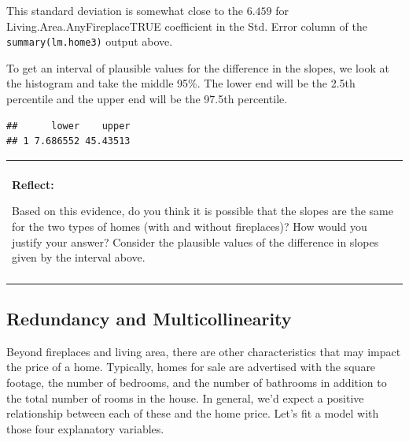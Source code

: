 \documentclass[
]{book}
\newenvironment{Shaded}{\begin{snugshade}}{\end{snugshade}}
\newcommand{\DataTypeTok}[1]{\textcolor[rgb]{0.13,0.29,0.53}{#1}}
\newcommand{\FloatTok}[1]{\textcolor[rgb]{0.00,0.00,0.81}{#1}}
\newcommand{\KeywordTok}[1]{\textcolor[rgb]{0.13,0.29,0.53}{\textbf{#1}}}
\newcommand{\NormalTok}[1]{#1}
\newcommand{\OperatorTok}[1]{\textcolor[rgb]{0.81,0.36,0.00}{\textbf{#1}}}
\newcommand{\StringTok}[1]{\textcolor[rgb]{0.31,0.60,0.02}{#1}}
\newenvironment{reflect}
{
    \begin{center}
    
    \begin{tabular}{|p{0.8\textwidth}|}
    \rowcolor{LightBlue}
    \hline\\
    \rowcolor{LightBlue}
    \textbf{Reflect:}
}
{
    \\\rowcolor{LightBlue}
    \\\hline
    \end{tabular} 
    \end{center}
}
\begin{document}
This standard deviation is somewhat close to the \(6.459\) for Living.Area.AnyFireplaceTRUE coefficient in the Std. Error column of the \texttt{summary(lm.home3)} output above.

To get an interval of plausible values for the difference in the slopes, we look at the histogram and take the middle 95\%. The lower end will be the 2.5th percentile and the upper end will be the 97.5th percentile.

\begin{Shaded}
\end{Shaded}

\begin{verbatim}
##      lower    upper
## 1 7.686552 45.43513
\end{verbatim}

\begin{reflect}
Based on this evidence, do you think it is possible that the slopes are
the same for the two types of homes (with and without fireplaces)? How
would you justify your answer? Consider the plausible values of the
difference in slopes given by the interval above.
\end{reflect}

\hypertarget{redundant}{%
\subsection{Redundancy and Multicollinearity}\label{redundant}}

Beyond fireplaces and living area, there are other characteristics that may impact the price of a home. Typically, homes for sale are advertised with the square footage, the number of bedrooms, and the number of bathrooms in addition to the total number of rooms in the house. In general, we'd expect a positive relationship between each of these and the home price. Let's fit a model with those four explanatory variables.

\begin{Shaded}
\end{Shaded}
\end{document}
